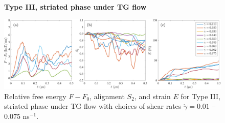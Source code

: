 \begin{figure}[h!]
\begin{center}
\textbf{Type III, striated phase under TG flow}\par\medskip
\includegraphics[width=\textwidth]{SMFigures/StTGRaw.pdf}
\end{center}
\caption{
Relative free energy $F - F_0$,
alignment $S_2$, and strain $E$ for
Type III, striated phase under TG flow with choices of shear rates $\dot\gamma=0.01$ -- $0.075$ ns$^{-1}$.
}
\label{fig:sttgraw}
\end{figure}




